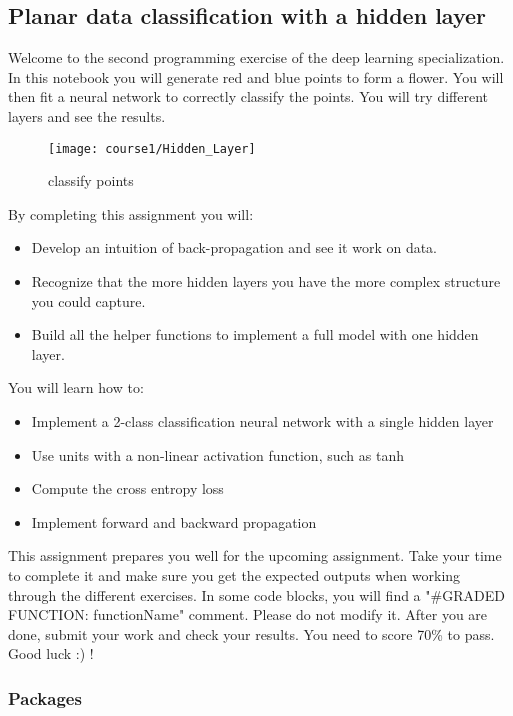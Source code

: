 \subsection{Planar data classification with a hidden layer}

Welcome to the second programming exercise of the deep learning specialization. In this notebook you will generate red and blue points to form a flower. You will then fit a neural network to correctly classify the points. You will try different layers and see the results.

\begin{figure}[h]
\begin{center}
\texttt{[image: course1/Hidden\_Layer]}
\end{center}
\caption{classify points}
\label{fig:Hidden_Layer}
\end{figure}

By completing this assignment you will:
\begin{itemize}
\item Develop an intuition of back-propagation and see it work on data.
\item Recognize that the more hidden layers you have the more complex structure you could capture.
\item Build all the helper functions to implement a full model with one hidden layer.
\end{itemize}


You will learn how to:
\begin{itemize}
\item Implement a 2-class classification neural network with a single hidden layer
\item Use units with a non-linear activation function, such as tanh
\item Compute the cross entropy loss
\item Implement forward and backward propagation
\end{itemize}

This assignment prepares you well for the upcoming assignment. Take your time to complete it and make sure you get the expected outputs when working through the different exercises. In some code blocks, you will find a "\#GRADED FUNCTION: functionName" comment. Please do not modify it. After you are done, submit your work and check your results. You need to score 70\% to pass. Good luck :) !


\subsubsection{Packages}

